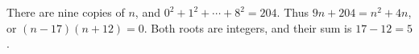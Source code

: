 There are nine copies of $n$, and $0^2+1^2+\cdots+8^2=204$. Thus $9n+204=n^2+4n$, or $(n-17)(n+12)=0$. Both roots are integers, and their sum is $17-12=\boxed5$.
